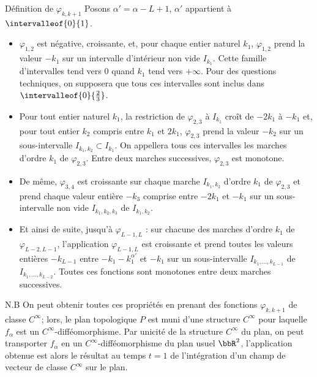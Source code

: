 \begin{enonce*}{Définition de $\varphi_{k,k+1}$}
Posons $\alpha'=\alpha-L+1$, $\alpha'$ appartient à $\intervalleof{0}{1}$.
\begin{itemize}
\item $\varphi_{1,2}$ est négative, croissante, et, pour chaque entier naturel $k_1$, $\varphi_{1,2}$ prend la valeur $-k_1$ sur un intervalle d'intérieur non vide $I_{k_1}$. Cette famille d'intervalles tend vers $0$ quand $k_1$ tend vers $+\infty$. Pour des questions techniques, on supposera que tous ces intervalles sont inclus dans $\intervalleof{0}{\frac{2}{3}}$.

\item Pour tout entier naturel $k_1$, la restriction de $\varphi_{2,3}$ à $I_{k_1}$ croît de $-2k_1$ à $-k_1$ et, pour tout entier {$k_2$ compris entre $k_1$ et $2k_1$}, $\varphi_{2,3}$ prend la valeur $-k_2$ sur un sous-intervalle $I_{k_1,k_2} \subset I_{k_1}$. On appellera tous ces intervalles les marches d'ordre $k_1$ de $\varphi_{2,3}$. Entre deux marches successives, $\varphi_{2,3}$ est monotone.

\item De même, $\varphi_{3,4}$ est croissante sur chaque marche $I_{k_1,k_2}$ d'ordre $k_1$ de $\varphi_{2,3}$ et {prend chaque valeur entière} $-k_3$ comprise entre $-2k_1$ et $-k_1$ sur un sous-intervalle non vide $I_{k_1,k_2,k_3}$ de $I_{k_1,k_2}$.

\item Et ainsi de suite, jusqu'à $\varphi_{L-1,L}$ : sur chacune des marches d'ordre $k_1$ de $\varphi_{L-2,L-1}$, l'application $\varphi_{L-1,L}$ est croissante et prend toutes les valeurs entières $-k_{L-1}$ entre $-k_1-k_1^{\alpha'}$ et $-k_1$ sur un sous-intervalle $I_{k_1,\dots, k_{L-1}}$ de $I_{k_1,\dots, k_{L-2}}$. Toutes ces fonctions sont monotones entre deux marches successives.
\end{itemize}
\end{enonce*}

\begin{enonce*}[remark]{N.B}
On peut obtenir toutes ces propriétés en prenant des fonctions $\varphi_{k,k+1}$ de classe $C^\infty$; lors, le plan topologique $P$ est muni d'une structure $C^\infty$ pour laquelle $f_\alpha$ est un $C^\infty$-difféomorphisme. Par unicité de la structure $C^\infty$ du plan, on peut transporter $f_\alpha$ en un $C^\infty$-difféomorphisme du plan usuel $\bbR^2$, l'application obtenue est alors le résultat au temps $t=1$ de l'intégration d'un champ de vecteur de classe $C^\infty$ sur le plan.
\end{enonce*}

